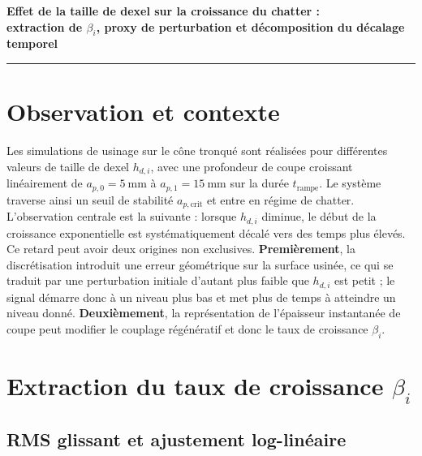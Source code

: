 \documentclass[11pt,a4paper]{article}
\newcommand{\apz}{a_{p,0}}
\newcommand{\apf}{a_{p,1}}
\newcommand{\apcrit}{a_{p,\mathrm{crit}}}
\newcommand{\trampe}{t_{\mathrm{rampe}}}
\newcommand{\dxli}{h_{d,i}}
\newcommand{\betai}{\beta_i}
\begin{document}
\begin{center}
  {\large\bfseries
    Effet de la taille de dexel sur la croissance du chatter :\\
    extraction de $\betai$, proxy de perturbation et décomposition du décalage temporel}\\[4pt]
\end{center}
\hrule

\section{Observation et contexte}

Les simulations de usinage sur le cône tronqué sont réalisées pour différentes valeurs de
taille de dexel $\dxli$, avec une profondeur de coupe croissant linéairement de
$\apz = \SI{5}{\milli\metre}$ à $\apf = \SI{15}{\milli\metre}$ sur la durée
$\trampe$. Le système traverse ainsi un seuil de stabilité $\apcrit$ et entre en
régime de chatter. L'observation centrale est la suivante : lorsque $\dxli$
diminue, le début de la croissance exponentielle est systématiquement décalé vers
des temps plus élevés. Ce retard peut avoir deux origines non exclusives.
\textbf{Premièrement}, la discrétisation introduit une erreur géométrique sur la
surface usinée, ce qui se traduit par une perturbation initiale d'autant plus
faible que $\dxli$ est petit ; le signal démarre donc à un niveau plus bas et met
plus de temps à atteindre un niveau donné.
\textbf{Deuxièmement}, la représentation de l'épaisseur instantanée de coupe
peut modifier le couplage régénératif et donc le taux de croissance $\betai$.


\section{Extraction du taux de croissance \texorpdfstring{$\betai$}{beta i}}

\subsection{RMS glissant et ajustement log-linéaire}
\end{document}
